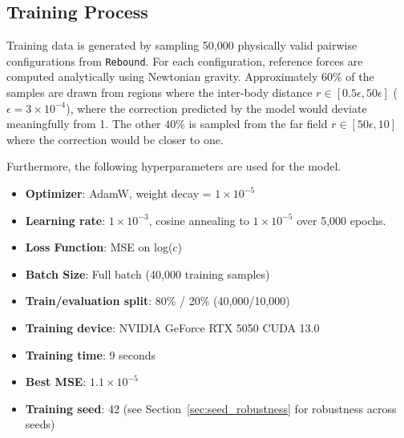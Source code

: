 \documentclass[12pt]{article}
\begin{document}

\subsection{Training Process}
\label{sec:training}
Training data is generated by sampling 50,000 physically valid pairwise configurations from \texttt{Rebound}. For each configuration, reference forces are computed analytically using Newtonian gravity. Approximately $60\%$ of the samples are drawn from regions where the inter-body distance $r\in [0.5 \epsilon, 50 \epsilon]$ ($\epsilon = 3 \times10^{-4}$), where the correction predicted by the model would deviate meaningfully from 1. The other $40\%$ is sampled from the far field $r\in[50\epsilon, 10]$ where the correction would be closer to one.

Furthermore, the following hyperparameters are used for the model.
\begin{itemize}
    \item \textbf{Optimizer}: AdamW, weight decay = $1\times10^{-5}$
    \item \textbf{Learning rate}: $1\times10^{-3}$, cosine annealing to $1\times10^{-5}$ \cite{loshchilov2017sgdr} over 5,000 epochs.
    \item \textbf{Loss Function}: MSE on log($c$)
    \item \textbf{Batch Size}: Full batch (40,000 training samples)
    \item \textbf{Train/evaluation split}: 80\% / 20\% (40,000/10,000)
    \item \textbf{Training device}: NVIDIA GeForce RTX 5050 CUDA 13.0
    \item \textbf{Training time}: 9 seconds
    \item \textbf{Best MSE}: $1.1 \times 10^{-5}$
    \item \textbf{Training seed}: 42 (see Section~\ref{sec:seed_robustness} for robustness across seeds)
\end{itemize}
\end{document}
